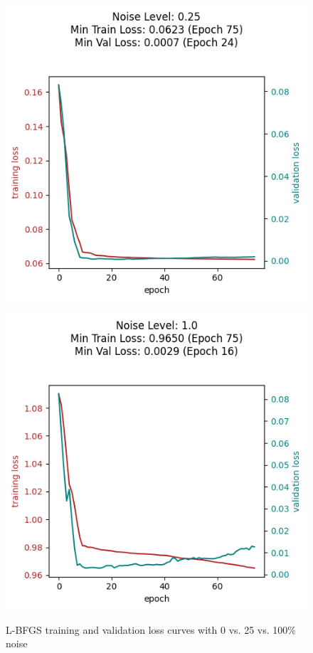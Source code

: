 \begin{figure}[h!]
\begin{minipage}[t]{0.32\textwidth}
        \includegraphics[width=\textwidth]{figures/noise-level-0-25.png}
        \label{fig:noise-level-0-25}
    \end{minipage}
    \begin{minipage}[t]{0.32\textwidth}
        \includegraphics[width=\textwidth]{figures/noise-level-1-0.png}
        \label{fig:noise-level-1-0}
    \end{minipage}
    \vspace{-20pt}
    \caption{L-BFGS training and validation loss curves with 0 vs. 25 vs. 100\% noise}
\end{figure}

